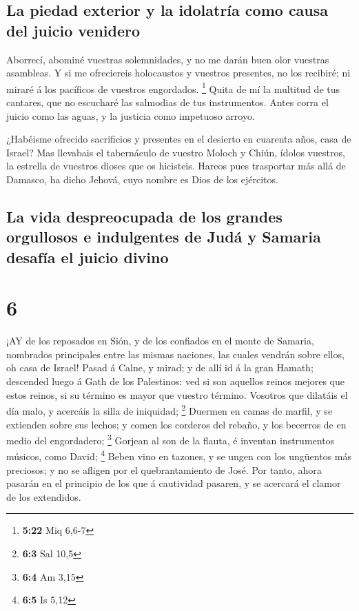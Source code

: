 \hypertarget{la-piedad-exterior-y-la-idolatruxeda-como-causa-del-juicio-venidero}{%
\subsection{La piedad exterior y la idolatría como causa del juicio
venidero}\label{la-piedad-exterior-y-la-idolatruxeda-como-causa-del-juicio-venidero}}

 Aborrecí, abominé vuestras solemnidades, y no me darán
buen olor vuestras asambleas.  Y si me ofreciereis
holocaustos y vuestros presentes, no los recibiré; ni miraré á los
pacíficos de vuestros engordados. \footnote{\textbf{5:22} Miq 6,6-7}
 Quita de mí la multitud de tus cantares, que no escucharé
las salmodias de tus instrumentos.  Antes corra el juicio
como las aguas, y la justicia como impetuoso arroyo.

 ¿Habéisme ofrecido sacrificios y presentes en el desierto
en cuarenta años, casa de Israel?  Mas llevabais el
tabernáculo de vuestro Moloch y Chiún, ídolos vuestros, la estrella de
vuestros dioses que os hicisteis.  Hareos pues trasportar
más allá de Damasco, ha dicho Jehová, cuyo nombre es Dios de los
ejércitos.

\hypertarget{la-vida-despreocupada-de-los-grandes-orgullosos-e-indulgentes-de-juduxe1-y-samaria-desafuxeda-el-juicio-divino}{%
\subsection{La vida despreocupada de los grandes orgullosos e
indulgentes de Judá y Samaria desafía el juicio
divino}\label{la-vida-despreocupada-de-los-grandes-orgullosos-e-indulgentes-de-juduxe1-y-samaria-desafuxeda-el-juicio-divino}}

\hypertarget{section-5}{%
\section{6}\label{section-5}}

 ¡AY de los reposados en Sión, y de los confiados en el
monte de Samaria, nombrados principales entre las mismas naciones, las
cuales vendrán sobre ellos, oh casa de Israel!  Pasad á
Calne, y mirad; y de allí id á la gran Hamath; descended luego á Gath de
los Palestinos: ved si son aquellos reinos mejores que estos reinos, si
su término es mayor que vuestro término.  Vosotros que
dilatáis el día malo, y acercáis la silla de iniquidad; \footnote{\textbf{6:3}
  Sal 10,5}  Duermen en camas de marfil, y se extienden
sobre sus lechos; y comen los corderos del rebaño, y los becerros de en
medio del engordadero; \footnote{\textbf{6:4} Am 3,15} 
Gorjean al son de la flauta, é inventan instrumentos músicos, como
David; \footnote{\textbf{6:5} Is 5,12}  Beben vino en
tazones, y se ungen con los ungüentos más preciosos; y no se afligen por
el quebrantamiento de José.  Por tanto, ahora pasarán en el
principio de los que á cautividad pasaren, y se acercará el clamor de
los extendidos.

